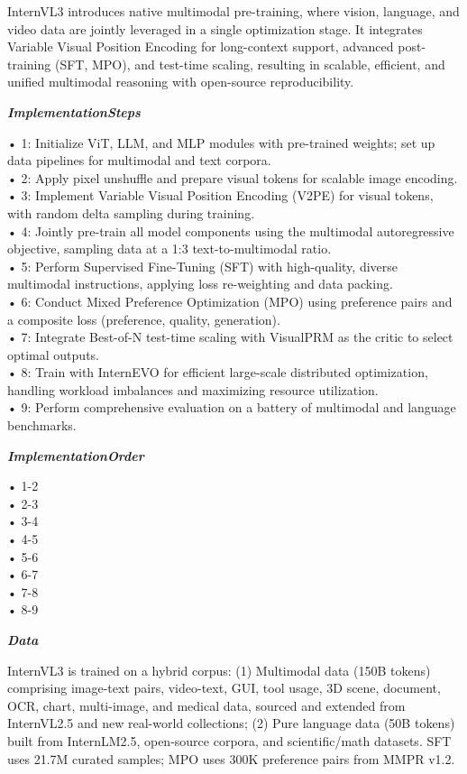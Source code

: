 \begin{tcolorbox}[
    breakable,
    title={Example of Idea Generation in Information},
    colback=LighterGray,
    colframe=DeepPurple,
    colbacktitle=DeepPurple,
    coltitle=White,
]
InternVL3 introduces native multimodal pre-training, where vision, language, and video data are
jointly leveraged in a single optimization stage. It integrates Variable Visual Position Encoding
for long-context support, advanced post-training (SFT, MPO), and test-time scaling, resulting in
scalable, efficient, and unified multimodal reasoning with open-source reproducibility.

\textbf{\emph{\textcolor{CaseOrange}{ImplementationSteps}}}

• 1: Initialize ViT, LLM, and MLP modules with pre-trained weights; set up data pipelines for multimodal and text corpora. \\
• 2: Apply pixel unshuffle and prepare visual tokens for scalable image encoding. \\
• 3: Implement Variable Visual Position Encoding (V2PE) for visual tokens, with random delta sampling during training. \\
• 4: Jointly pre-train all model components using the multimodal autoregressive objective, sampling data at a 1:3 text-to-multimodal ratio. \\
• 5: Perform Supervised Fine-Tuning (SFT) with high-quality, diverse multimodal instructions, applying loss re-weighting and data packing. \\
• 6: Conduct Mixed Preference Optimization (MPO) using preference pairs and a composite loss (preference, quality, generation). \\
• 7: Integrate Best-of-N test-time scaling with VisualPRM as the critic to select optimal outputs. \\
• 8: Train with InternEVO for efficient large-scale distributed optimization, handling workload imbalances and maximizing resource utilization. \\
• 9: Perform comprehensive evaluation on a battery of multimodal and language benchmarks. 

\textbf{\emph{\textcolor{CaseOrange}{ImplementationOrder}}}

• 1-2 \\
• 2-3 \\
• 3-4 \\
• 4-5 \\
• 5-6 \\
• 6-7 \\
• 7-8 \\
• 8-9 

\textbf{\emph{\textcolor{CaseOrange}{Data}}}

InternVL3 is trained on a hybrid corpus: (1) Multimodal data (150B tokens) comprising image-text
pairs, video-text, GUI, tool usage, 3D scene, document, OCR, chart, multi-image, and medical data,
sourced and extended from InternVL2.5 and new real-world collections; (2) Pure language data (50B
tokens) built from InternLM2.5, open-source corpora, and scientific/math datasets. SFT uses 21.7M
curated samples; MPO uses 300K preference pairs from MMPR v1.2.


\end{tcolorbox}
